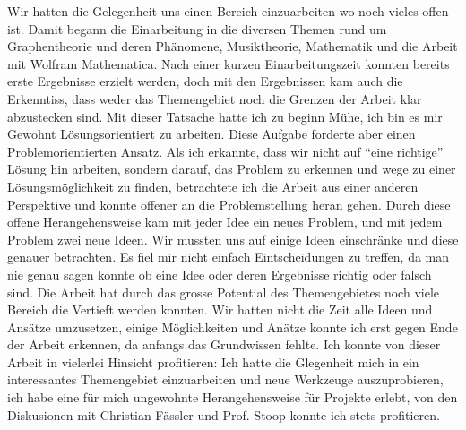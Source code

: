 Wir hatten die Gelegenheit uns einen
Bereich einzuarbeiten wo noch vieles offen ist. Damit begann die Einarbeitung in
die diversen Themen rund um Graphentheorie und deren Phänomene, Musiktheorie,
Mathematik und die Arbeit mit Wolfram Mathematica. Nach einer kurzen
Einarbeitungszeit konnten bereits erste Ergebnisse erzielt werden, doch mit den
Ergebnissen kam auch die Erkenntiss, dass weder das Themengebiet noch die
Grenzen der Arbeit klar abzustecken sind. Mit dieser Tatsache hatte ich zu
beginn Mühe, ich bin es mir Gewohnt Lösungsorientiert zu arbeiten. Diese Aufgabe
forderte aber einen Problemorientierten Ansatz. Als ich erkannte, dass wir nicht
auf \enquote{eine richtige} Lösung hin arbeiten, sondern darauf, das Problem zu
erkennen und wege zu einer Lösungsmöglichkeit zu finden, betrachtete ich die
Arbeit aus einer anderen Perspektive und konnte offener an die Problemstellung
heran gehen. Durch diese offene Herangehensweise kam mit jeder Idee ein neues
Problem, und mit jedem Problem zwei neue Ideen. Wir mussten uns auf einige Ideen
einschränke und diese genauer betrachten. Es fiel mir nicht einfach
Eintscheidungen zu treffen, da man nie genau sagen konnte ob eine Idee oder
deren Ergebnisse richtig oder falsch sind. Die Arbeit hat durch das grosse
Potential des Themengebietes noch viele Bereich die Vertieft werden konnten. Wir
hatten nicht die Zeit alle Ideen und Ansätze umzusetzen, einige Möglichkeiten
und Anätze konnte ich erst gegen Ende der Arbeit erkennen, da anfangs das
Grundwissen fehlte. Ich konnte von dieser Arbeit in vielerlei Hinsicht
profitieren: Ich hatte die Glegenheit mich in ein interessantes Themengebiet
einzuarbeiten und neue Werkzeuge auszuprobieren, ich habe eine für mich
ungewohnte Herangehensweise für Projekte erlebt, von den Diskusionen mit
Christian Fässler und Prof. Stoop konnte ich stets profitieren.
